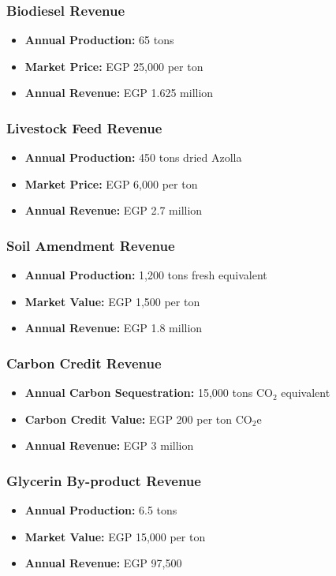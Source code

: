 \subsubsection{Biodiesel Revenue}
\begin{itemize}
    \item \textbf{Annual Production:} 65 tons
    \item \textbf{Market Price:} EGP 25,000 per ton
    \item \textbf{Annual Revenue:} EGP 1.625 million
\end{itemize}

\subsubsection{Livestock Feed Revenue}
\begin{itemize}
    \item \textbf{Annual Production:} 450 tons dried Azolla
    \item \textbf{Market Price:} EGP 6,000 per ton
    \item \textbf{Annual Revenue:} EGP 2.7 million
\end{itemize}

\subsubsection{Soil Amendment Revenue}
\begin{itemize}
    \item \textbf{Annual Production:} 1,200 tons fresh equivalent
    \item \textbf{Market Value:} EGP 1,500 per ton
    \item \textbf{Annual Revenue:} EGP 1.8 million
\end{itemize}

\subsubsection{Carbon Credit Revenue}
\begin{itemize}
    \item \textbf{Annual Carbon Sequestration:} 15,000 tons CO$_2$ equivalent
    \item \textbf{Carbon Credit Value:} EGP 200 per ton CO$_2$e
    \item \textbf{Annual Revenue:} EGP 3 million
\end{itemize}

\subsubsection{Glycerin By-product Revenue}
\begin{itemize}
    \item \textbf{Annual Production:} 6.5 tons
    \item \textbf{Market Value:} EGP 15,000 per ton
    \item \textbf{Annual Revenue:} EGP 97,500
\end{itemize}

